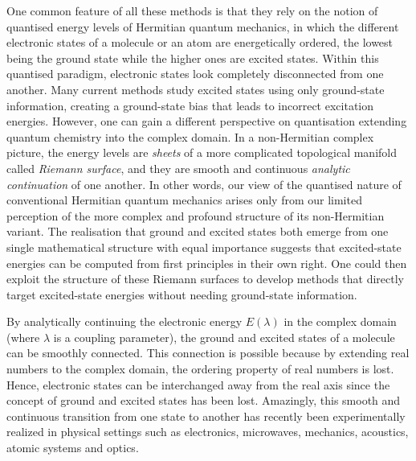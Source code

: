 \documentclass[aps,prb,reprint,noshowkeys,superscriptaddress]{revtex4-1}
\begin{document}
One common feature of all these methods is that they rely on the notion of quantised energy levels of Hermitian quantum mechanics, in which the different electronic states of a molecule or an atom are energetically ordered, the lowest being the ground state while the higher ones are excited states. 
Within this quantised paradigm, electronic states look completely disconnected from one another.
Many current methods study excited states using only ground-state information, creating a ground-state bias that leads to incorrect excitation energies.
However, one can gain a different perspective on quantisation extending quantum chemistry into the complex domain.
In a non-Hermitian complex picture, the energy levels are \textit{sheets} of a more complicated topological manifold called \textit{Riemann surface}, and they are smooth and continuous \textit{analytic continuation} of one another. 
In other words, our view of the quantised nature of conventional Hermitian quantum mechanics arises only from our limited perception of the more complex and profound structure of its non-Hermitian variant. \cite{MoiseyevBook,BenderPTBook}
The realisation that ground and excited states both emerge from one single mathematical structure with equal importance suggests that excited-state energies can be computed from first principles in their own right. 
One could then exploit the structure of these Riemann surfaces to develop methods that directly target excited-state energies without needing ground-state information. \cite{Burton_2019,Burton_2019a}

By analytically continuing the electronic energy $E(\lambda)$ in the complex domain (where $\lambda$ is a coupling parameter), the ground and excited states of a molecule can be smoothly connected.
This connection is possible because by extending real numbers to the complex domain, the ordering property of real numbers is lost.
Hence, electronic states can be interchanged away from the real axis since the concept of ground and excited states has been lost.
Amazingly, this smooth and continuous transition from one state to another has recently been experimentally realized in physical settings such as electronics, microwaves, mechanics, acoustics, atomic systems and optics. \cite{Bittner_2012,Chong_2011,Chtchelkatchev_2012,Doppler_2016,Guo_2009,Hang_2013,Liertzer_2012,Longhi_2010,Peng_2014, Peng_2014a,Regensburger_2012,Ruter_2010,Schindler_2011,Szameit_2011,Zhao_2010,Zheng_2013,Choi_2018,El-Ganainy_2018}
\end{document}
